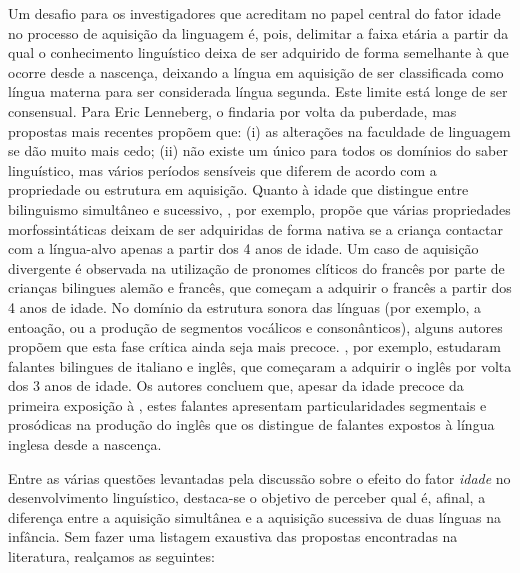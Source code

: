 \documentclass[output=paper]{LSP/langsci}
\begin{document}
Um desafio para os investigadores que acreditam no papel central do fator idade no processo de aquisição da linguagem é, pois, delimitar a faixa etária a partir da qual o conhecimento linguístico deixa de ser adquirido de forma semelhante à que ocorre desde a nascença, deixando a língua em aquisição de ser classificada como língua materna para ser considerada língua segunda. Este limite está longe de ser consensual. Para Eric Lenneberg, o  findaria por volta da puberdade, mas propostas mais recentes propõem que: (i) as alterações na faculdade de linguagem se dão muito mais cedo; (ii) não existe um único  para todos os domínios do saber linguístico, mas vários períodos sensíveis que diferem de acordo com a propriedade ou estrutura em aquisição. Quanto à idade que distingue entre bilinguismo simultâneo e sucessivo, \cite{meisel2008}, por exemplo, propõe que várias propriedades morfossintáticas deixam de ser adquiridas de forma nativa se a criança contactar com a língua-alvo apenas a partir dos 4 anos de idade. Um caso de aquisição divergente é observada na utilização de pronomes clíticos do francês por parte de crianças bilingues alemão e francês, que começam a adquirir o francês a partir dos 4 anos de idade. No domínio da estrutura sonora das línguas (por exemplo, a entoação, ou a produção de segmentos vocálicos e consonânticos), alguns autores propõem que esta fase crítica ainda seja mais precoce. \cite{flege_etal1997}, por exemplo, estudaram falantes bilingues de italiano e inglês, que começaram a adquirir o inglês por volta dos 3 anos de idade. Os autores concluem que, apesar da idade precoce da primeira exposição à , estes falantes apresentam particularidades segmentais e prosódicas na produção do inglês que os distingue de falantes expostos à língua inglesa desde a nascença.

Entre as várias questões levantadas pela discussão sobre o efeito do fator \textit{idade} no desenvolvimento linguístico, destaca-se o objetivo de perceber qual é, afinal, a diferença entre a aquisição simultânea e a aquisição sucessiva de duas línguas na infância. Sem fazer uma listagem exaustiva das propostas encontradas na literatura, realçamos as seguintes:
\end{document}
